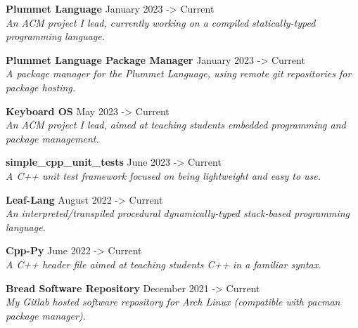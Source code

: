 \documentclass[10pt,letterpaper]{article}
\newcommand{\customtext}[2]{%
    {\fontsize{#1}{\dimexpr #1pt+2pt}\selectfont #2}%
}
\begin{document}
\begin{flushleft}
    {\customtext{12}{\textbf{Plummet Language}} \hfill \customtext{12}{January 2023 -> Current}} \\
    \customtext{10}{\textit{An ACM project I lead, currently working on a compiled statically-typed programming language.}}
    \vspace{14pt}

    {\customtext{12}{\textbf{Plummet Language Package Manager}} \hfill \customtext{12}{January 2023 -> Current}} \\
    \customtext{10}{\textit{A package manager for the Plummet Language, using remote git repositories for package hosting.}}
    \vspace{14pt}

    {\customtext{12}{\textbf{Keyboard OS}} \hfill \customtext{12}{May 2023 -> Current}} \\
    \customtext{10}{\textit{An ACM project I lead, aimed at teaching students embedded programming and package management.}}
    \vspace{14pt}

    {\customtext{12}{\textbf{simple\_cpp\_unit\_tests}} \hfill \customtext{12}{June 2023 -> Current}} \\
    \customtext{10}{\textit{A C++ unit test framework focused on being lightweight and easy to use.}}
    \vspace{14pt}

    {\customtext{12}{\textbf{Leaf-Lang}} \hfill \customtext{12}{August 2022 -> Current}} \\
    \customtext{10}{\textit{An interpreted/transpiled procedural dynamically-typed stack-based programming language.}}
    \vspace{14pt}


    {\customtext{12}{\textbf{Cpp-Py}} \hfill \customtext{12}{June 2022 -> Current}} \\
    \customtext{10}{\textit{A C++ header file aimed at teaching students C++ in a familiar syntax.}}
    \vspace{14pt}


    {\customtext{12}{\textbf{Bread Software Repository}} \hfill \customtext{12}{December 2021 -> Current}} \\
    \customtext{10}{\textit{My Gitlab hosted software repository for Arch Linux (compatible with pacman package manager).}}
    \vspace{14pt}



\end{flushleft}
\end{document}
